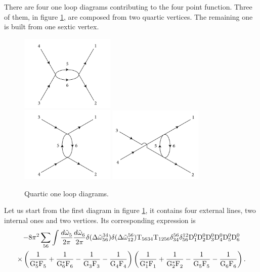 There are four  one loop diagrams contributing to the four point function. Three of them, in figure \ref{fig:quarticoneloop}, are composed from two quartic vertices.
The remaining one is built from one sextic vertex.
\begin{figure}[ht]
    \centering
    \includegraphics[width=0.4\textwidth]{images/schanneloneloop.jpg}\\
    \includegraphics[width=0.4\textwidth]{images/tchanneloneloop.jpg}
    \includegraphics[width=0.4\textwidth]{images/uchanneloneloop.jpg}
    \caption{Quartic one loop diagrams.}
    \label{fig:quarticoneloop}
\end{figure} 
Let us start from the first diagram in figure \ref{fig:quarticoneloop}, it contains four external lines, two internal ones and two vertices. Its corresponding expression is
\begin{multline}
    -8\pi^2\sum_{56}\int \frac{d\tilde{\omega}^{}_5}{2\pi}\frac{d\tilde{\omega}^{}_6}{2\pi}\delta(\Delta{\tilde{\omega}}^{34}_{56})\delta(\Delta{\tilde{\omega}}^{56}_{12})\mathrm{T}_{5634}\mathrm{T}_{1256}\delta^{56}_{34}
    \delta^{12}_{56}\mathrm{D}_1^0\mathrm{D}_2^0\mathrm{D}_3^0\mathrm{D}_4^0\mathrm{D}_5^0\mathrm{D}_6^0 \\ 
    \times \left(\dfrac{1}{\mathrm{G}_5^*\mathrm{F}_5^{}}+\dfrac{1}{\mathrm{G}_6^*\mathrm{F}_6^{}}-\dfrac{1}{\mathrm{G}_3^{}\mathrm{F}_3^{}}
    -\dfrac{1}{\mathrm{G}_4^{}\mathrm{F}_4^{}}\right)\left(\dfrac{1}{\mathrm{G}_1^*\mathrm{F}_1^{}}+\dfrac{1}{\mathrm{G}_2^*\mathrm{F}_2^{}}-\dfrac{1}{\mathrm{G}_5^{}\mathrm{F}_5^{}}
    -\dfrac{1}{\mathrm{G}_6^{}\mathrm{F}_6^{}}\right).
    \label{schannel}
\end{multline}
